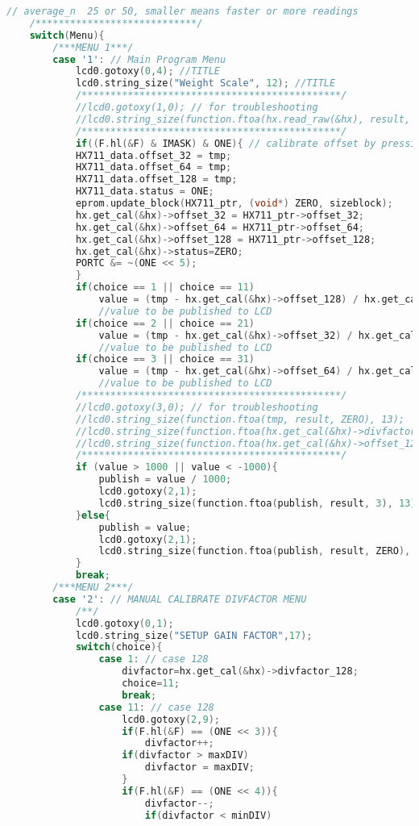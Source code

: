 \begin{lstlisting}[language=C, caption={main.c}, label=main-c, captionpos=b]
	// average_n  25 or 50, smaller means faster or more readings
	/****************************/
	switch(Menu){
		/***MENU 1***/
		case '1': // Main Program Menu
			lcd0.gotoxy(0,4); //TITLE
			lcd0.string_size("Weight Scale", 12); //TITLE
			/*********************************************/
			//lcd0.gotoxy(1,0); // for troubleshooting
			//lcd0.string_size(function.ftoa(hx.read_raw(&hx), result, ZERO), 13);
			/*********************************************/
			if((F.hl(&F) & IMASK) & ONE){ // calibrate offset by pressing button 1
			HX711_data.offset_32 = tmp;
			HX711_data.offset_64 = tmp;
			HX711_data.offset_128 = tmp;
			HX711_data.status = ONE;
			eprom.update_block(HX711_ptr, (void*) ZERO, sizeblock);
			hx.get_cal(&hx)->offset_32 = HX711_ptr->offset_32;
			hx.get_cal(&hx)->offset_64 = HX711_ptr->offset_64;
			hx.get_cal(&hx)->offset_128 = HX711_ptr->offset_128;
			hx.get_cal(&hx)->status=ZERO;
			PORTC &= ~(ONE << 5);
			}
			if(choice == 1 || choice == 11)
				value = (tmp - hx.get_cal(&hx)->offset_128) / hx.get_cal(&hx)->divfactor_128; 
				//value to be published to LCD
			if(choice == 2 || choice == 21)
				value = (tmp - hx.get_cal(&hx)->offset_32) / hx.get_cal(&hx)->divfactor_32; 
				//value to be published to LCD
			if(choice == 3 || choice == 31)
				value = (tmp - hx.get_cal(&hx)->offset_64) / hx.get_cal(&hx)->divfactor_64; 
				//value to be published to LCD
			/*********************************************/
			//lcd0.gotoxy(3,0); // for troubleshooting
			//lcd0.string_size(function.ftoa(tmp, result, ZERO), 13);
			//lcd0.string_size(function.ftoa(hx.get_cal(&hx)->divfactor_128, result, ZERO), 13);
			//lcd0.string_size(function.ftoa(hx.get_cal(&hx)->offset_128, result, ZERO), 13);
			/*********************************************/
			if (value > 1000 || value < -1000){
				publish = value / 1000;
				lcd0.gotoxy(2,1);
				lcd0.string_size(function.ftoa(publish, result, 3), 13); lcd0.string_size("Kg", 4);
			}else{
				publish = value;
				lcd0.gotoxy(2,1);
				lcd0.string_size(function.ftoa(publish, result, ZERO), 13); lcd0.string_size("gram", 4);
			}
			break;
		/***MENU 2***/
		case '2': // MANUAL CALIBRATE DIVFACTOR MENU
			/**/
			lcd0.gotoxy(0,1);
			lcd0.string_size("SETUP GAIN FACTOR",17);
			switch(choice){
				case 1: // case 128
					divfactor=hx.get_cal(&hx)->divfactor_128;
					choice=11;
					break;
				case 11: // case 128
					lcd0.gotoxy(2,9);
					if(F.hl(&F) == (ONE << 3)){
						divfactor++;
					if(divfactor > maxDIV)
						divfactor = maxDIV;
					}
					if(F.hl(&F) == (ONE << 4)){
						divfactor--;
						if(divfactor < minDIV)

\end{lstlisting}
